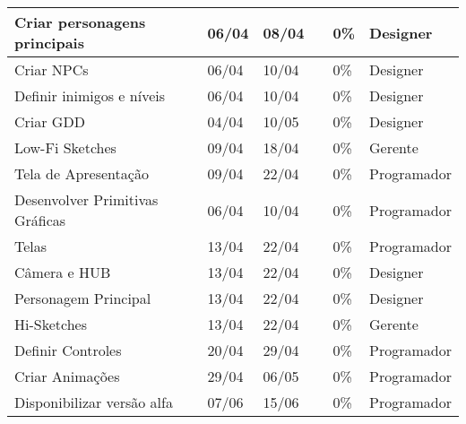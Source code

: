 \documentclass[a4paper, 11pt]{article} %
\begin{document}
\begin{table}[h]
\begin{tabular}{|l|l|l|l|l|l|}
Criar personagens principais                 & 06/04           & 08/04        &                    & 0\%                & Designer             \\ \hline
Criar NPCs                                   & 06/04           & 10/04        &                    & 0\%                & Designer             \\ \hline
Definir inimigos e níveis                    & 06/04           & 10/04        &                    & 0\%                & Designer             \\ \hline
Criar GDD                                    & 04/04           & 10/05        &                    & 0\%                & Designer             \\ \hline
Low-Fi Sketches                              & 09/04           & 18/04        &                    & 0\%                & Gerente              \\ \hline
Tela de Apresentação                         & 09/04           & 22/04        &                    & 0\%                & Programador          \\ \hline
Desenvolver Primitivas Gráficas              & 06/04           & 10/04        &                    & 0\%                & Programador          \\ \hline
Telas                                        & 13/04           & 22/04        &                    & 0\%                & Programador          \\ \hline
Câmera e HUB                                 & 13/04           & 22/04        &                    & 0\%                & Designer             \\ \hline
Personagem Principal                         & 13/04           & 22/04        &                    & 0\%                & Designer             \\ \hline
Hi-Sketches                                  & 13/04           & 22/04        &                    & 0\%                & Gerente              \\ \hline
Definir Controles                            & 20/04           & 29/04        &                    & 0\%                & Programador          \\ \hline
Criar Animações                              & 29/04           & 06/05        &                    & 0\%                & Programador          \\ \hline
Disponibilizar versão alfa                   & 07/06           & 15/06        &                    & 0\%                & Programador          \\ \hline

\end{tabular}
\end{table}
\end{document}
